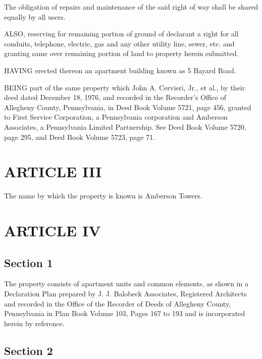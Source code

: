 \documentclass[
  14pt,
]{book}
\begin{document}
The obligation of repairs and maintenance of the said right of way shall be shared equally by all users.

ALSO, reserving for remaining portion of ground of declarant a right for all conduits, telephone, electric, gas and any other utility line, sewer, etc. and granting same over remaining portion of land to property herein submitted.

HAVING erected thereon an apartment building known as 5 Bayard Road.

BEING part of the same property which John A. Cervieri, Jr., et al., by their deed dated December 18, 1976, and recorded in the Recorder's Office of Allegheny County, Pennsylvania, in Deed Book Volume 5721, page 456, granted to First Service Corporation, a Pennsylvania corporation and Amberson Associates, a Pennsylvania Limited Partnership. See Deed Book Volume 5720, page 295, and Deed Book Volume 5723, page 71.

\hypertarget{article-iii}{%
\section*{ARTICLE III}\label{article-iii}}

The name by which the property is known is Amberson Towers.

\hypertarget{article-iv}{%
\section*{ARTICLE IV}\label{article-iv}}

\hypertarget{section-1}{%
\subsection*{Section 1}\label{section-1}}

The property consists of apartment units and common elements, as shown in a Declaration Plan prepared by J. J. Balobeck Associates, Registered Architects and recorded in the Office of the Recorder of Deeds of Allegheny County, Pennsylvania in Plan Book Volume 103, Pages 167 to 193 and is incorporated herein by reference.

\hypertarget{section-2}{%
\subsection*{Section 2}\label{section-2}}
\end{document}
